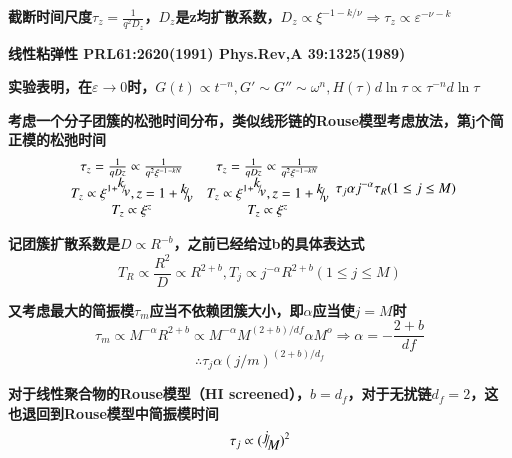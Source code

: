 \documentclass{article} %
\begin{document}
{\bf  截断时间尺度$\tau _{z} =\frac{1}{q^{2} D_{z} } $，$D_{z} $是z均扩散系数，$D_{z} \propto \xi ^{-1-k/\nu } \Rightarrow \tau _{z} \propto \varepsilon ^{-\nu -k} $}


{\bf  线性粘弹性 PRL61:2620(1991) Phys.Rev,A 39:1325(1989)}


{\bf  实验表明，在$\varepsilon \to 0$时，$G(t)\propto t^{-n} ,G'\sim G''\sim \omega ^{n} ,H(\tau )d\ln \tau \propto \tau ^{-n} d\ln \tau $}


{\bf  考虑一个分子团簇的松弛时间分布，类似线形链的Rouse模型考虑放法，第j个简正模的松弛时间
\[\begin{array}{c} {\tau _{z} =\frac{1}{qDz} \propto \frac{1}{q^{2} \xi ^{-1} {}^{-kN} } } \\ {T_{z} \propto \xi ^{1+{\raise0.7ex\hbox{$ k $}\!\mathord{\left/ {\vphantom {k v}} \right. \kern-\nulldelimiterspace}\!\lower0.7ex\hbox{$ v $}} } ,z=1+{\raise0.7ex\hbox{$ k $}\!\mathord{\left/ {\vphantom {k v}} \right. \kern-\nulldelimiterspace}\!\lower0.7ex\hbox{$ v $}} } \\ {T_{z} \propto \xi ^{z} } \end{array}\begin{array}{c} {\tau _{z} =\frac{1}{qDz} \propto \frac{1}{q^{2} \xi ^{-1} {}^{-kN} } } \\ {T_{z} \propto \xi ^{1+{\raise0.7ex\hbox{$ k $}\!\mathord{\left/ {\vphantom {k v}} \right. \kern-\nulldelimiterspace}\!\lower0.7ex\hbox{$ v $}} } ,z=1+{\raise0.7ex\hbox{$ k $}\!\mathord{\left/ {\vphantom {k v}} \right. \kern-\nulldelimiterspace}\!\lower0.7ex\hbox{$ v $}} } \\ {T_{z} \propto \xi ^{z} } \end{array}\tau _{j} \alpha j^{-\alpha } \tau _{R} (1\le j\le M)\] }

{\bf 记团簇扩散系数是$D\propto R^{-b} $，之前已经给过b的具体表达式
\[T_{R} \propto \frac{R^{2} }{D} \propto R^{2+b} ,T_{j} \propto j^{-\alpha } R^{2+b} (1\le j\le M)\] }

{\bf 又考虑最大的简振模$\tau _{m} $应当不依赖团簇大小，即$\alpha $应当使$j=M$时
\[\tau _{m} \propto M^{-\alpha } R^{2+b} \propto M^{-\alpha } M^{(2+b)/df} \alpha M^{o} \Rightarrow \alpha =-\frac{2+b}{df} \] 
\[\therefore \tau _{j} \alpha (j/m)^{(2+b)/d_{f} } \] }

{\bf 对于线性聚合物的Rouse模型（HI screened），$b=d_{f} $，对于无扰链$d_{f} =2$，这也退回到Rouse模型中简振模时间
\[\tau _{j} \propto ({\raise0.7ex\hbox{$ j $}\!\mathord{\left/ {\vphantom {j M}} \right. \kern-\nulldelimiterspace}\!\lower0.7ex\hbox{$ M $}} )^{2} \] }
\end{document}

